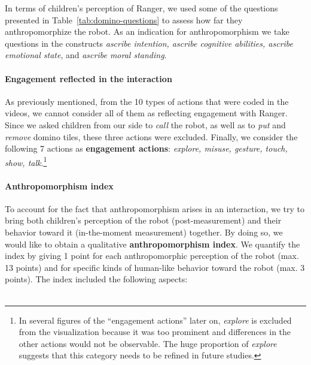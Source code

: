 \documentclass{sig-alternate}
\begin{document}
In terms of children's perception of Ranger, we used some of the questions
presented in Table~\ref{tab:domino-questions} to assess how far they
anthropomorphize the robot. As an indication for anthropomorphism we take
questions in the constructs \textit{ascribe intention, ascribe cognitive
abilities, ascribe emotional state}, and \textit{ascribe moral standing}.


\paragraph{Engagement reflected in the interaction}	

As previously mentioned, from the 10 types of actions that were coded in the
videos, we cannot consider all of them as reflecting engagement with Ranger.
Since we asked children from our side to \textit{call} the robot, as well as to
\textit{put} and \textit{remove} domino tiles, these three actions were
excluded. Finally, we consider the following 7 actions as \textbf{engagement
actions}: \textit{explore, misuse, gesture, touch, show, talk}.\footnote{In
several figures of the ``engagement actions'' later on, \textit{explore} is
excluded from the visualization because it was too prominent and differences in
the other actions would not be observable. The huge proportion of
\textit{explore} suggests that this category needs to be refined in future
studies.}



\paragraph{Anthropomorphism index}
\label{sec:domino-anth-score}

To account for the fact that anthropomorphism arises in an interaction, we try
to bring both children's perception of the robot (post-measurement) and their
behavior toward it (in-the-moment measurement) together. By doing so, we would
like to obtain a qualitative \textbf{anthropomorphism index}. We quantify the
index by giving 1 point for each anthropomorphic perception of the robot (max.
13 points) and for specific kinds of human-like behavior toward the robot (max.
3 points). The index included the following aspects:\\ \\
\end{document}
